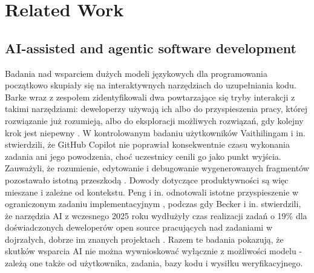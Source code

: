 \section{Related Work}\label{sec:related}

\subsection{AI-assisted and agentic software development}
Badania nad wsparciem dużych modeli językowych dla programowania początkowo skupiały się na interaktywnych narzędziach do uzupełniania kodu. Barke wraz z zespołem zidentyfikowali dwa powtarzające się tryby interakcji z takimi narzędziami: deweloperzy używają ich albo do przyspieszenia pracy, której rozwiązanie już rozumieją, albo do eksploracji możliwych rozwiązań, gdy kolejny krok jest niepewny \cite{barke2023grounded}. W kontrolowanym badaniu użytkowników Vaithilingam i in. stwierdzili, że GitHub Copilot nie poprawiał konsekwentnie czasu wykonania zadania ani jego powodzenia, choć uczestnicy cenili go jako punkt wyjścia. Zauważyli, że rozumienie, edytowanie i debugowanie wygenerowanych fragmentów pozostawało istotną przeszkodą \cite{vaithilingam2022expectation}. Dowody dotyczące produktywności są więc mieszane i zależne od kontekstu. Peng i in. odnotowali istotne przyspieszenie w ograniczonym zadaniu implementacyjnym \cite{peng2023impact}, podczas gdy Becker i in. stwierdzili, że narzędzia AI z wczesnego 2025 roku wydłużyły czas realizacji zadań o 19\% dla doświadczonych deweloperów open source pracujących nad zadaniami w dojrzałych, dobrze im znanych projektach \cite{becker2025impact}. Razem te badania pokazują, że skutków wsparcia AI nie można wywnioskować wyłącznie z możliwości modelu - zależą one także od użytkownika, zadania, bazy kodu i wysiłku weryfikacyjnego.

